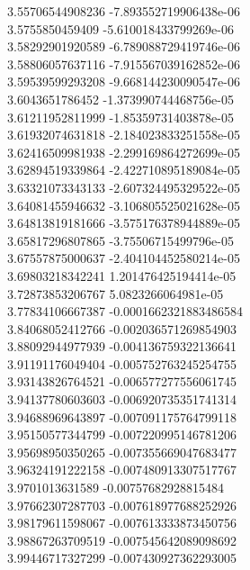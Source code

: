 {3.55706544908236 -7.893552719906438e-06 \\
3.5755850459409 -5.610018433799269e-06 \\
3.58292901920589 -6.789088729419746e-06 \\
3.58806057637116 -7.915567039162852e-06 \\
3.59539599293208 -9.668144230090547e-06 \\
3.6043651786452 -1.373990744468756e-05 \\
3.61211952811999 -1.85359731403878e-05 \\
3.61932074631818 -2.184023833251558e-05 \\
3.62416509981938 -2.299169864272699e-05 \\
3.62894519339864 -2.422710895189084e-05 \\
3.63321073343133 -2.607324495329522e-05 \\
3.64081455946632 -3.106805525021628e-05 \\
3.64813819181666 -3.575176378944889e-05 \\
3.65817296807865 -3.75506715499796e-05 \\
3.67557875000637 -2.404104452580214e-05 \\
3.69803218342241 1.201476425194414e-05 \\
3.72873853206767 5.0823266064981e-05 \\
3.77834106667387 -0.0001662321883486584 \\
3.84068052412766 -0.002036571269854903 \\
3.88092944977939 -0.004136759322136641 \\
3.91191176049404 -0.005752763245254755 \\
3.93143826764521 -0.006577277556061745 \\
3.94137780603603 -0.006920735351741314 \\
3.94688969643897 -0.007091175764799118 \\
3.95150577344799 -0.007220995146781206 \\
3.95698950350265 -0.007355669047683477 \\
3.96324191222158 -0.007480913307517767 \\
3.9701013631589 -0.00757682928815484 \\
3.97662307287703 -0.007618977688252926 \\
3.98179611598067 -0.007613333873450756 \\
3.98867263709519 -0.007545642089098692 \\
3.99446717327299 -0.007430927362293005 \\
}
